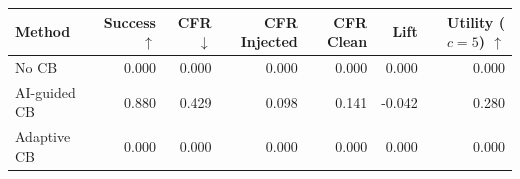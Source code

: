 \begin{tabular}{lrrrrrr}
\toprule
Method & Success $\uparrow$ & CFR $\downarrow$ & CFR Injected & CFR Clean & Lift & Utility ($c=5$) $\uparrow$ \\
\midrule
No CB & 0.000 & 0.000 & 0.000 & 0.000 & 0.000 & 0.000 \\
AI-guided CB & 0.880 & 0.429 & 0.098 & 0.141 & -0.042 & 0.280 \\
Adaptive CB & 0.000 & 0.000 & 0.000 & 0.000 & 0.000 & 0.000 \\
\bottomrule
\end{tabular}
